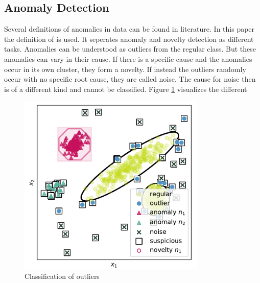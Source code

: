 \subsection{Anomaly Detection}
Several definitions of anomalies in data can be found in literature. In this paper the definition of \cite[p. 54]{gruhl_novelty_2022} is used. It seperates anomaly and novelty detection as different tasks. Anomalies can be understood as outliers from the regular class. But these anomalies can vary in their cause. If there is a specific cause and the anomalies occur in its own cluster, they form a novelty. If instead the outliers randomly occur with no specific root cause, they are called noise. The cause for noise then is of a different kind and cannot be classified. Figure \ref{fig_anomaly_gruhl} visualizes the different
\begin{figure}[h!] %
  \centering
  \includegraphics[width=0.8\textwidth]{images/gruhl_anomaly_definition.png}
  \caption{Classification of outliers \cite[p. 54]{gruhl_novelty_2022}}
  \label{fig_anomaly_gruhl}
\end{figure}

